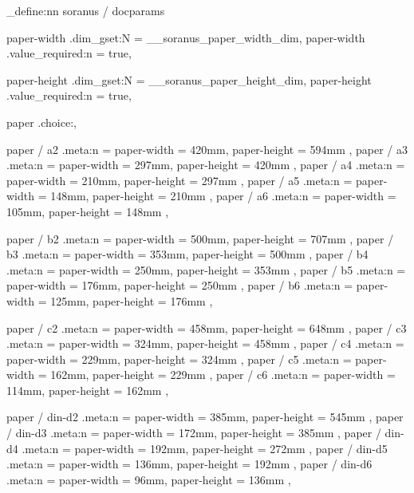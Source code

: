%
%
%
% 
%

%

\keys_define:nn { soranus / docparams }
  {
    paper-width .dim_gset:N       = \g__soranus_paper_width_dim,
    paper-width .value_required:n = true,

    paper-height .dim_gset:N       = \g__soranus_paper_height_dim,
    paper-height .value_required:n = true,


    paper .choice:,

    paper / a2 .meta:n = { paper-width = 420mm, paper-height = 594mm },
    paper / a3 .meta:n = { paper-width = 297mm, paper-height = 420mm },
    paper / a4 .meta:n = { paper-width = 210mm, paper-height = 297mm },
    paper / a5 .meta:n = { paper-width = 148mm, paper-height = 210mm },
    paper / a6 .meta:n = { paper-width = 105mm, paper-height = 148mm },

    paper / b2 .meta:n = { paper-width = 500mm, paper-height = 707mm },
    paper / b3 .meta:n = { paper-width = 353mm, paper-height = 500mm },
    paper / b4 .meta:n = { paper-width = 250mm, paper-height = 353mm },
    paper / b5 .meta:n = { paper-width = 176mm, paper-height = 250mm },
    paper / b6 .meta:n = { paper-width = 125mm, paper-height = 176mm },

    paper / c2 .meta:n = { paper-width = 458mm, paper-height = 648mm },
    paper / c3 .meta:n = { paper-width = 324mm, paper-height = 458mm },
    paper / c4 .meta:n = { paper-width = 229mm, paper-height = 324mm },
    paper / c5 .meta:n = { paper-width = 162mm, paper-height = 229mm },
    paper / c6 .meta:n = { paper-width = 114mm, paper-height = 162mm },

    paper / din-d2 .meta:n = { paper-width = 385mm, paper-height = 545mm },
    paper / din-d3 .meta:n = { paper-width = 172mm, paper-height = 385mm },
    paper / din-d4 .meta:n = { paper-width = 192mm, paper-height = 272mm },
    paper / din-d5 .meta:n = { paper-width = 136mm, paper-height = 192mm },
    paper / din-d6 .meta:n = { paper-width = 96mm, paper-height = 136mm },

}
